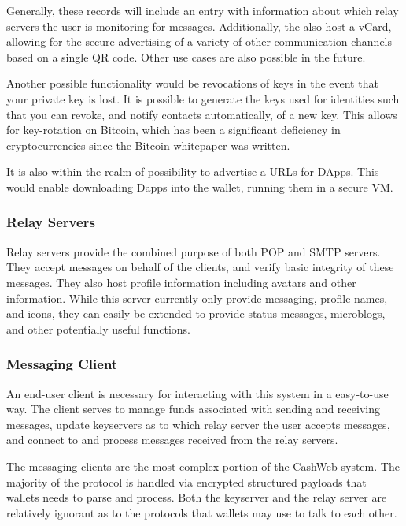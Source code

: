 \documentclass{article}
\theoremstyle{definition}
\begin{document}
Generally, these records will include an entry with information about which relay servers the user is monitoring for messages. Additionally, the also host a vCard, allowing for the secure advertising of a variety of other communication channels based on a single QR code. Other use cases are also possible in the future.

Another possible functionality would be revocations of keys in the event that your private key is lost. It is possible to generate the keys used for identities such that you can revoke, and notify contacts automatically, of a new key. This allows for key-rotation on Bitcoin, which has been a significant deficiency in cryptocurrencies since the Bitcoin whitepaper was written.

It is also within the realm of possibility to advertise a URLs for DApps. This would enable downloading Dapps into the wallet, running them in a secure VM.

\subsubsection{Relay Servers}

Relay servers provide the combined purpose of both POP and SMTP servers. They accept messages on behalf of the clients, and verify basic integrity of these messages. They also host profile information including avatars and other information. While this server currently only provide messaging, profile names, and icons, they can easily be extended to provide status messages, microblogs, and other potentially useful functions.

\subsubsection{Messaging Client}

An end-user client is necessary for interacting with this system in a easy-to-use way. The client serves to manage funds associated with sending and receiving messages,   update keyservers as to which relay server the user accepts messages, and connect to and process messages received from the relay servers.

The messaging clients are the most complex portion of the CashWeb system. The majority of the protocol is handled via encrypted structured payloads that wallets needs to parse and process. Both the keyserver and the relay server are relatively ignorant as to the protocols that wallets may use to talk to each other.
\end{document}

